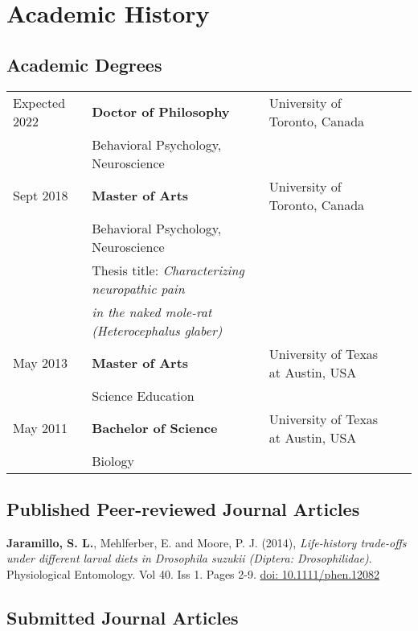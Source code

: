 \documentclass[letterpaper]{article}
\renewenvironment{itemize}{
  \begin{list}{}{
    \setlength{\leftmargin}{1.5em}
  }
}{
  \end{list}
}
\begin{document}
\section*{Academic History}

\subsection*{Academic Degrees}
\begin{tabular}{llll}
Expected 2022 & {\bf Doctor of Philosophy}		& University of Toronto, Canada \\
& {Behavioral Psychology, Neuroscience}\\
Sept 2018		& {\bf Master of Arts}		& University of Toronto, Canada \\
& {Behavioral Psychology, Neuroscience}\\
&Thesis title: \textit{Characterizing neuropathic pain}\\
& \textit{in the naked mole-rat (Heterocephalus glaber)}\\
May 2013         	& {\bf Master of Arts}			& University of Texas at Austin, USA \\
& {Science Education}\\
May 2011         	& {\bf Bachelor of Science}						& University of Texas at Austin, USA \\
& {Biology}\\

\end{tabular}


\subsection*{Published Peer-reviewed Journal Articles}

\begin{itemize}

\item \textbf {Jaramillo, S. L.}, Mehlferber, E. and Moore, P. J. (2014), 
\textit{Life-history trade-offs under different larval diets in Drosophila suzukii 
(Diptera: Drosophilidae)}. Physiological Entomology. Vol 40. Iss 1. Pages 2-9.
\href{http://onlinelibrary.wiley.com/doi/10.1111/phen.12082/full}{doi: 10.1111/phen.12082}
\end{itemize}

\subsection*{Submitted Journal Articles}
\end{document}
